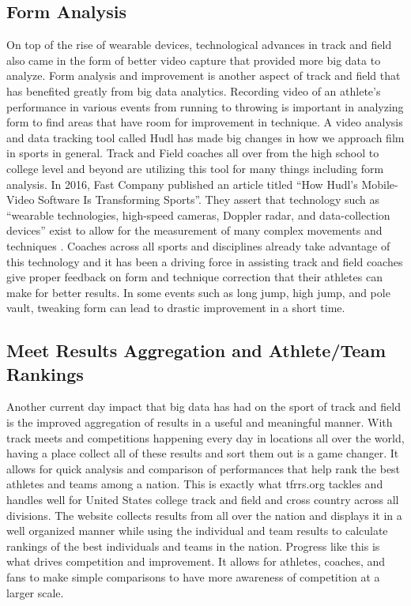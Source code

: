 \documentclass[sigconf]{acmart}
\begin{document}
\subsection{Form Analysis}
On top of the rise of wearable devices, technological advances in track and field also came in the form of better video capture that provided more big data to analyze. Form analysis and improvement is another aspect of track and field that has benefited greatly from big data analytics. Recording video of an athlete's performance in various events from running to throwing is important in analyzing form to find areas that have room for improvement in technique. A video analysis and data tracking tool called Hudl has made big changes in how we approach film in sports in general. Track and Field coaches all over from the high school to college level and beyond are utilizing this tool for many things including form analysis. In 2016, Fast Company published an article titled ``How Hudl’s Mobile-Video Software Is Transforming Sports''. They assert that technology such as ``wearable technologies, high-speed cameras, Doppler radar, and data-collection devices'' exist to allow for the measurement of many complex movements and techniques \cite{Shaer2016}. Coaches across all sports and disciplines already take advantage of this technology and it has been a driving force in assisting track and field coaches give proper feedback on form and technique correction that their athletes can make for better results. In some events such as long jump, high jump, and pole vault, tweaking form can lead to drastic improvement in a short time.

\subsection{Meet Results Aggregation and Athlete/Team Rankings}
Another current day impact that big data has had on the sport of track and field is the improved aggregation of results in a useful and meaningful manner. With track meets and competitions happening every day in locations all over the world, having a place collect all of these results and sort them out is a game changer. It allows for quick analysis and comparison of performances that help rank the best athletes and teams among a nation. This is exactly what tfrrs.org tackles and handles well for United States college track and field and cross country across all divisions. The website collects results from all over the nation and displays it in a well organized manner while using the individual and team results to calculate rankings of the best individuals and teams in the nation. Progress like this is what drives competition and improvement. It allows for athletes, coaches, and fans to make simple comparisons to have more awareness of competition at a larger scale.
\end{document}
